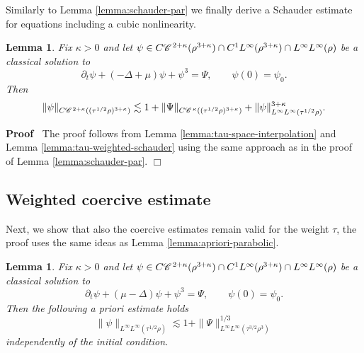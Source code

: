 \documentclass[a4paper,11pt]{article}
\newenvironment{proof}{\noindent\textbf{Proof\ }}{\hspace*{\fill}$\Box$\medskip}
\newtheorem{lemma}[theorem]{Lemma}
\numberwithin{equation}{section}
\newcommand{\CC}{\mathscr{C} \hspace{.1em}}
\newcommand{\8}{\infty}
\begin{document}
Similarly to Lemma \ref{lemma:schauder-par} we finally  derive a Schauder estimate for equations including a cubic nonlinearity.

\begin{lemma}
  \label{lemma:schauder-par1}
Fix $\kappa > 0$ and let $\psi \in C\CC^{2 +
  \kappa} (\rho^{3 + \kappa}) \cap C^{1}L^{\infty} (\rho^{3+\kappa})\cap L^{\infty}L^{\infty}(\rho)$ be a classical solution
  to
  \[ \partial_{t}\psi+(- \Delta + \mu) \psi + \psi^3 = \Psi ,\qquad \psi(0)=\psi_{0}.\]
Then
  \[ \| \psi \|_{C\CC^{2 + \kappa} ((\tau^{1/2}\rho)^{3 + \kappa})} \lesssim  1+ \|
     \Psi \|_{C\CC^{\kappa} ((\tau^{1/2}\rho)^{3 + \kappa})} + \| \psi \|_{L^{\infty}L^{\infty}
     (\tau^{1/2}\rho)}^{3 + \kappa}. \]
\end{lemma}


\begin{proof}
The proof follows from Lemma \ref{lemma:tau-space-interpolation} and Lemma \ref{lemma:tau-weighted-schauder} using the same approach as in the proof of Lemma \ref{lemma:schauder-par}.
\end{proof}





\subsection{Weighted  coercive estimate}
\label{ss:d2}

Next, we show that also the coercive estimates remain valid for the weight $\tau$, the proof uses the same ideas as Lemma \ref{lemma:apriori-parabolic}.

\begin{lemma}
  \label{lemma:weighted-coercive}
  Fix $\kappa > 0$ and let $\psi \in C\CC^{2 +
  \kappa} (\rho^{3 + \kappa}) \cap C^{1}L^{\infty} (\rho^{3+\kappa})\cap L^{\infty}L^{\infty}(\rho)$ be a classical solution
  to
  \[ \partial_t \psi + (\mu - \Delta) \psi + \psi^3 = \Psi, \qquad \psi (0) =
     \psi_0 . \]
  Then the following a priori estimate holds
  \[ \| \psi \|_{L^{\infty} L^{\infty} (\tau^{1 / 2} \rho)} \lesssim 1+ \|
     \Psi \|^{1 / 3}_{L^{\infty} L^{\infty} (\tau^{3 / 2} \rho^3)}  \]
     independently of the initial condition.
\end{lemma}
\end{document}
